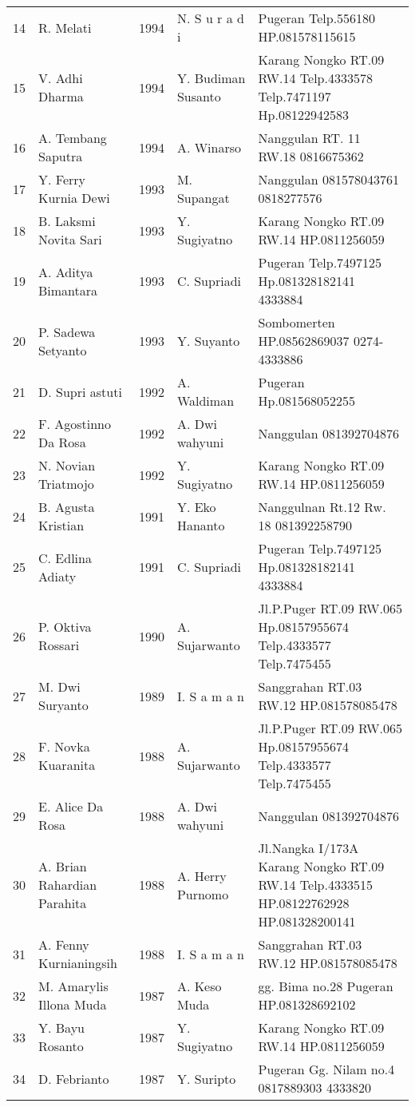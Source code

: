 \documentclass[a5paper,titlepage,11pt]{book}
\begin{document}
\begin{tabular}{|r|p{2.75cm}|p{0.75cm}|p{2.75cm}|p{3cm}|}
14&R. Melati&1994&N. S u r a d i&Pugeran Telp.556180 HP.081578115615\\
15&V. Adhi Dharma&1994&Y. Budiman Susanto&Karang Nongko  RT.09 RW.14 Telp.4333578 Telp.7471197 Hp.08122942583\\
16&A. Tembang Saputra&1994&A. Winarso&Nanggulan RT. 11 RW.18 0816675362\\
17&Y. Ferry Kurnia Dewi&1993&M. Supangat&Nanggulan 081578043761 0818277576\\
18&B. Laksmi Novita Sari&1993&Y. Sugiyatno&Karang Nongko RT.09 RW.14 HP.0811256059\\
19&A. Aditya Bimantara&1993&C. Supriadi&Pugeran Telp.7497125 Hp.081328182141 4333884\\
20&P. Sadewa Setyanto&1993&Y. Suyanto&Sombomerten HP.08562869037 0274-4333886\\
21&D. Supri astuti&1992&A. Waldiman&Pugeran Hp.081568052255\\
22&F. Agostinno Da Rosa&1992&A. Dwi wahyuni&Nanggulan 081392704876\\
23&N. Novian Triatmojo&1992&Y. Sugiyatno&Karang Nongko RT.09 RW.14 HP.0811256059\\
24&B. Agusta Kristian&1991&Y. Eko Hananto&Nanggulnan Rt.12 Rw. 18 081392258790\\
25&C. Edlina Adiaty&1991&C. Supriadi&Pugeran Telp.7497125 Hp.081328182141 4333884\\
26&P. Oktiva Rossari&1990&A. Sujarwanto&Jl.P.Puger RT.09 RW.065 Hp.08157955674 Telp.4333577 Telp.7475455\\
27&M. Dwi Suryanto&1989&I. S a m a n&Sanggrahan RT.03 RW.12 HP.081578085478\\
28&F. Novka Kuaranita&1988&A. Sujarwanto&Jl.P.Puger RT.09 RW.065 Hp.08157955674 Telp.4333577 Telp.7475455\\
29&E. Alice Da Rosa&1988&A. Dwi wahyuni&Nanggulan 081392704876\\
30&A. Brian Rahardian Parahita&1988&A. Herry Purnomo&Jl.Nangka I/173A Karang Nongko RT.09 RW.14 Telp.4333515 HP.08122762928 HP.081328200141\\
31&A. Fenny Kurnianingsih&1988&I. S a m a n&Sanggrahan RT.03 RW.12 HP.081578085478\\
32&M. Amarylis Illona Muda&1987&A. Keso Muda&gg. Bima no.28 Pugeran HP.081328692102\\
33&Y. Bayu Rosanto&1987&Y. Sugiyatno&Karang Nongko RT.09 RW.14 HP.0811256059\\
34&D. Febrianto&1987&Y. Suripto&Pugeran Gg. Nilam no.4 0817889303 4333820\\

\end{tabular}
\end{document}
